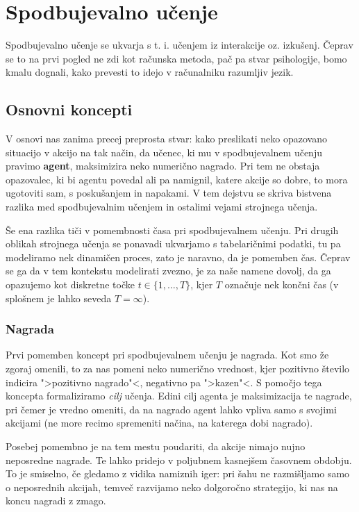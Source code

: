 \documentclass[12pt,a4paper]{amsart}
\theoremstyle{definition} %
\theoremstyle{plain} %
\begin{document}
\section{Spodbujevalno učenje}
Spodbujevalno učenje se ukvarja s t. i. učenjem iz interakcije oz. izkušenj. Čeprav se to na prvi 
pogled ne zdi kot računska metoda, pač pa stvar psihologije, bomo kmalu dognali, kako prevesti 
to idejo v računalniku razumljiv jezik.

\subsection{Osnovni koncepti}
V osnovi nas zanima precej preprosta stvar: kako preslikati neko opazovano situacijo v akcijo na 
tak način, da učenec, ki mu v spodbujevalnem učenju pravimo \textbf{agent}, maksimizira neko 
numerično nagrado. Pri tem ne obstaja opazovalec, ki bi agentu povedal ali pa namignil, katere 
akcije so dobre, to mora ugotoviti sam, s poskušanjem in napakami. V tem dejstvu se skriva 
bistvena razlika med spodbujevalnim učenjem in ostalimi vejami strojnega učenja. 

Še ena razlika tiči v pomembnosti časa pri spodbujevalnem učenju. Pri drugih oblikah 
strojnega učenja se ponavadi ukvarjamo s tabelaričnimi podatki, tu pa modeliramo nek 
dinamičen proces, zato je naravno, da je pomemben čas. Čeprav se ga da v tem kontekstu 
modelirati zvezno, je za naše namene dovolj, da ga opazujemo kot diskretne točke $t \in 
\{1, \dots, T\} $, kjer $T$ označuje nek končni čas (v splošnem je lahko seveda $T = \infty$).

\subsubsection{Nagrada}
Prvi pomemben koncept pri spodbujevalnem učenju je nagrada. Kot smo že zgoraj omenili, to za nas 
pomeni neko numerično vrednost, kjer pozitivno število indicira ">pozitivno nagrado"<, negativno pa 
">kazen"<. S pomočjo tega koncepta formaliziramo \textit{cilj} učenja. Edini cilj agenta je 
maksimizacija te nagrade, pri čemer je vredno omeniti, da na nagrado agent lahko vpliva samo 
s svojimi akcijami (ne more recimo spremeniti načina, na katerega dobi nagrado). 

Posebej pomembno je na tem mestu poudariti, da akcije nimajo nujno neposredne nagrade. Te 
lahko pridejo v poljubnem kasnejšem časovnem obdobju. To je smiselno, če gledamo z vidika 
namiznih iger: pri šahu ne razmišljamo samo o neposrednih akcijah, temveč razvijamo neko 
dolgoročno strategijo, ki nas na koncu nagradi z zmago. 
\end{document}
